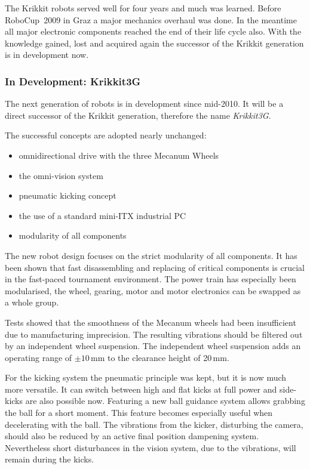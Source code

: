 \documentclass[12pt,a4paper]{article}
\begin{document}
The Krikkit robots served well for four years and much was learned.
Before RoboCup~2009 in Graz a major mechanics overhaul was done.
In the meantime all major electronic components reached the end of their life cycle also.
With the knowledge gained, lost and acquired again the successor of the Krikkit generation is in development now.
    

\subsubsection{In Development: Krikkit3G}

The next generation of robots is in development since mid-2010.
It will be a direct successor of the Krikkit generation, therefore the name \emph{Krikkit3G}.

The successful concepts are adopted nearly unchanged:\nopagebreak[4] %
\begin{itemize}
  \item omnidirectional drive with the three Mecanum Wheels
  \item the omni-vision system
  \item pneumatic kicking concept
  \item the use of a standard mini-ITX industrial PC
  \item modularity of all components
\end{itemize}

The new robot design focuses on the strict modularity of all components.
It has been shown that fast disassembling and replacing of critical components is crucial in the fast-paced tournament environment.
The power train has especially been modularised, the wheel, gearing, motor and motor electronics can be swapped as a whole group.

Tests showed that the smoothness of the Mecanum wheels had been insufficient due to manufacturing imprecision.
The resulting vibrations should be filtered out by an independent wheel suspension.
The independent wheel suspension adds an  operating range of $\pm 10$\,mm to the clearance height of 20\,mm.


For the kicking system the pneumatic principle was kept, but it is now much more versatile. 
It can switch between high and flat kicks at full power and side-kicks are also possible now.
Featuring a new ball guidance system allows grabbing the ball for a short moment.
This feature becomes especially useful when decelerating with the ball.
The vibrations from the kicker, disturbing the camera, should also be reduced by an active final position dampening system.
Nevertheless short disturbances in the vision system, due to the vibrations, will remain during the kicks.
\end{document}
